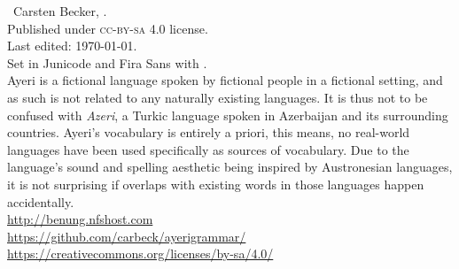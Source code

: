 
\begin{minipage}[b][\textheight][b]{0.67\textwidth}\small
\ccbysa~Carsten Becker, \the\year.\\
Published under \textsc{cc-by-sa} 4.0 license.\\
Last edited: \today{}.\\[.5\baselineskip]

Set in Junicode and {\sffamily Fira Sans} with \XeTeX{}.\\[.5\baselineskip]

Ayeri is a fictional language spoken by fictional people in a fictional setting, 
and as such is not related to any naturally existing languages. It is thus not 
to be confused with \emph{Azeri}, a Turkic language spoken in Azerbaijan and its 
surrounding countries. Ayeri’s vocabulary is entirely a priori, this means, no 
real-world languages have been used specifically as sources of vocabulary. Due 
to the language’s sound and spelling aesthetic being inspired by Austronesian 
languages, it is not surprising if overlaps with existing words in those 
languages happen accidentally.\\[.5\baselineskip]

\href{http://benung.nfshost.com}{http://benung.nfshost.com}\\
\href{https://github.com/carbeck/ayerigrammar}{https://github.com/carbeck/ayerigrammar/}\\
\href{https://creativecommons.org/licenses/by-sa/4.0/}{https://creativecommons.org/licenses/by-sa/4.0/}%

\end{minipage}
